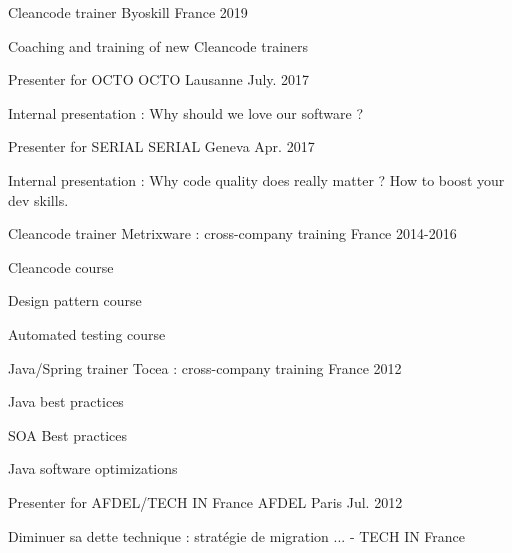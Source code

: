 

\begin{cventries}
    
\cventry
{Cleancode trainer} %
{Byoskill} %
{France} %
{2019} %
{
    \begin{cvitems} %
        \item {Coaching and training of new Cleancode trainers}
    \end{cvitems}
}
\cventry
{Presenter for OCTO} %
{OCTO} %
{Lausanne} %
{July. 2017} %
{
    \begin{cvitems} %
        \item {Internal presentation : Why should we love our software ?}
    \end{cvitems}
}

\cventry
{Presenter for SERIAL} %
{SERIAL} %
{Geneva} %
{Apr. 2017} %
{
    \begin{cvitems} %
        \item {Internal presentation : Why code quality does really matter ? How to boost your dev skills.}
    \end{cvitems}
}
\cventry
{Cleancode trainer} %
{Metrixware : cross-company training} %
{France} %
{2014-2016} %
{
    \begin{cvitems} %
        \item {Cleancode course}
        \item {Design pattern course}
        \item {Automated testing course}
    \end{cvitems}
} 
\cventry
{Java/Spring trainer} %
{Tocea : cross-company training} %
{France} %
{2012} %
{
    \begin{cvitems} %
        \item {Java best practices}
        \item {SOA Best practices}
        \item {Java software optimizations}
    \end{cvitems}
}
  \cventry
    {Presenter for AFDEL/TECH IN France} %
    {AFDEL} %
    {Paris} %
    {Jul. 2012} %
    {
      \begin{cvitems} %
        \item {Diminuer sa dette technique : stratégie de migration ... - TECH IN France}
      \end{cvitems}
    }


\end{cventries}
